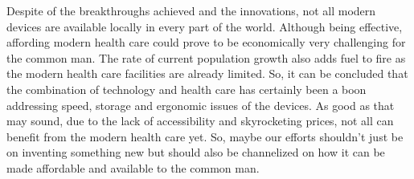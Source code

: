 \documentclass[12pt]{article}
\begin{document}
\begin{large}
\linebreak
Despite of the breakthroughs achieved and the innovations, not all modern devices are available locally in every part of the world. Although being effective, affording modern health care could prove to be economically very challenging for the common man. The rate of current population growth also adds fuel to fire as the modern health care facilities are already limited.
\linebreak
\linebreak
So, it can be concluded that the combination of technology and health care has certainly been a boon addressing speed, storage and ergonomic issues of the devices. As good as that may sound, due to the lack of accessibility and skyrocketing prices, not all can benefit from the modern health care yet. So, maybe our efforts shouldn't just be on inventing something new but should also be channelized on how it can be made affordable and available to the common man.


\end{large}
\end{document}
